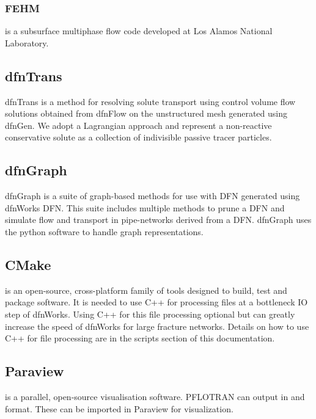 \documentclass[letterpaper,10pt,english]{sphinxmanual}
\begin{document}
\subsubsection{FEHM}
\label{\detokenize{intro:fehm}}
 is a subsurface multiphase flow code developed at Los Alamos National
Laboratory.


\subsection{dfnTrans}
\label{\detokenize{intro:dfntrans}}
dfnTrans is a method for resolving solute transport using control volume flow
solutions obtained from dfnFlow on the unstructured mesh generated using
dfnGen. We adopt a Lagrangian approach and represent a non-reactive
conservative solute as a collection of indivisible passive tracer particles.


\subsection{dfnGraph}
\label{\detokenize{intro:dfngraph}}
dfnGraph is a suite of graph-based methods for use with DFN generated using
dfnWorks DFN. This suite includes multiple methods to prune a DFN and simulate
flow and transport in pipe-networks derived from a DFN. dfnGraph uses the
 python software to handle graph representations.


\subsection{CMake}
\label{\detokenize{intro:cmake}}
 is an open-source, cross-platform family of tools designed to build,
test and package software. It is needed to use C++ for processing files at a
bottleneck IO step of dfnWorks. Using C++ for this file processing optional
but can greatly increase the speed of dfnWorks for large fracture networks.
Details on how to use C++ for file processing are in the scripts section of
this documentation.


\subsection{Paraview}
\label{\detokenize{intro:paraview}}
 is a parallel, open-source visualisation software. PFLOTRAN can
output in  and  format. These can be imported in Paraview
for visualization.
\end{document}
